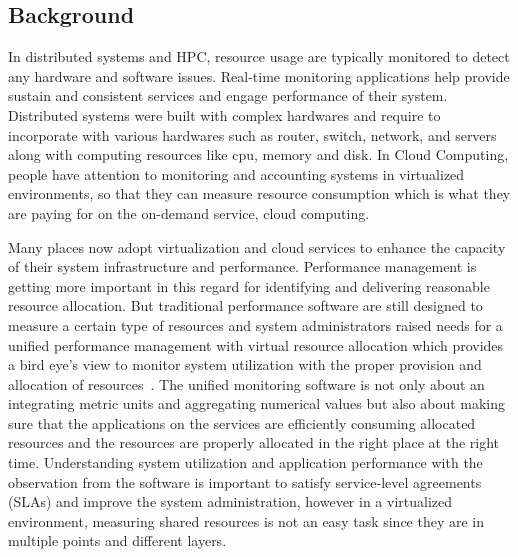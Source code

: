 \documentclass{sig-alternate-05-2015}
\begin{document}
\subsection{Background}
In distributed systems and HPC, resource usage are typically monitored to detect any hardware and software issues. Real-time monitoring applications help provide sustain and consistent services and engage performance of their system. Distributed systems were built with complex hardwares and require to incorporate with various hardwares such as router, switch, network, and servers along with computing resources like cpu, memory and disk. In Cloud Computing, people have attention to monitoring and accounting systems in virtualized environments, so that they can measure resource consumption which is what they are paying for on the on-demand service, cloud computing. 

Many places now adopt virtualization and cloud services to enhance the capacity of their system infrastructure and performance. Performance management is getting more important in this regard for identifying and delivering reasonable resource allocation. But traditional performance software are still designed to measure a certain type of resources and system administrators raised needs for a unified performance management with virtual resource allocation which provides a bird eye's view to monitor system utilization with the proper provision and allocation of resources~\cite{Habibzai12}. The unified monitoring software is not only about an integrating metric units and aggregating numerical values but also about making sure that the applications on the services are efficiently consuming allocated resources and the resources are properly allocated in the right place at the right time. Understanding system utilization and application performance with the observation from the software is important to satisfy service-level agreements (SLAs) and improve the system administration, however in a virtualized environment, measuring shared resources is not an easy task since they are in multiple points and different layers. 

\iffalse
\end{document}
